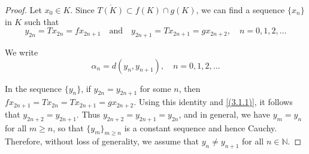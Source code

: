 \documentclass[10pt,a4paper]{amsart}
\begin{document}
\begin{proof}
Let $x_0 \in K$. Since $\overline{T(K)} \subset f(K) \cap g(K)$, we can find a sequence $\{x_n\}$ in $K$ such that
\begin{equation}
y_{2n} = Tx_{2n} = fx_{2n+1} \quad \text{and} \quad y_{2n+1} = Tx_{2n+1} = gx_{2n+2}, \quad n=0,1,2,\ldots
\end{equation}

We write
\begin{equation}
\alpha_n = d(y_n, y_{n+1}), \quad n=0,1,2,\ldots
\end{equation}

In the sequence $\{y_n\}$, if $y_{2n} = y_{2n+1}$ for some $n$, then $fx_{2n+1} = Tx_{2n} = Tx_{2n+1} = gx_{2n+2}$. Using this identity and \eqref{(3.1.1)}, it follows that $y_{2n+2} = y_{2n+1}$. Thus $y_{2n+2} = y_{2n+1} = y_{2n}$, and in general, we have $y_m = y_n$ for all $m \geq n$, so that $\{y_m\}_{m \geq n}$ is a constant sequence and hence Cauchy. Therefore, without loss of generality, we assume that $y_n \neq y_{n+1}$ for all $n \in \mathbb{N}$.


\end{proof}
\end{document}
